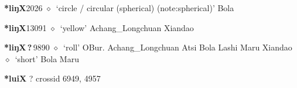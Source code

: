   \begin{list}{}{\leftmargin=1.5em \itemindent=-1.5em}
  \item {\footnotesize \textbf{*liŋX}}{\tiny 2026}
         $\diamond$~`circle / circular (spherical) (note:spherical)'
         Bola 
  \item {\footnotesize \textbf{*liŋX}}{\tiny 13091}
\hspace{1ex}
         $\diamond$~`yellow'
         Achang\_Longchuan 
\hspace{1ex}
         Xiandao 
  \item {\footnotesize \textbf{*liŋX\,?\,}}{\tiny 9890}
\hspace{1ex}
         $\diamond$~`roll'
         OBur. 
\hspace{1ex}
         Achang\_Longchuan 
\hspace{1ex}
         Atsi 
\hspace{1ex}
         Bola 
\hspace{1ex}
         Lashi 
\hspace{1ex}
         Maru 
\hspace{1ex}
         Xiandao 
\hspace{1ex}
         $\diamond$~`short'
         Bola 
\hspace{1ex}
         Maru 
  \end{list}
\item
\textbf{*luiX}
?
  {\tiny crossid 6949, 4957}
